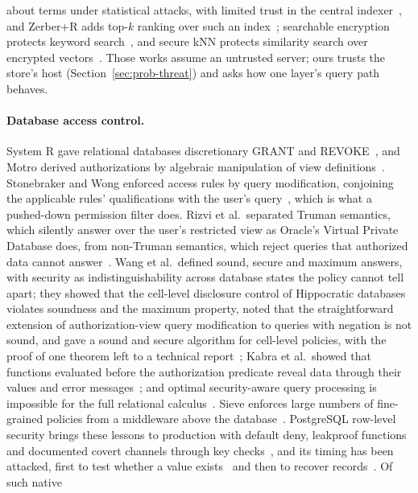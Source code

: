 about terms under statistical attacks, with limited trust in the central indexer~\cite{zerr2008zerber},
and Zerber+R adds top-$k$ ranking over such an index~\cite{zerr2009zerberr}; searchable encryption
protects keyword search~\cite{song2000practical,curtmola2006searchable}, and secure kNN protects
similarity search over encrypted vectors~\cite{wong2009secure}. Those works assume an untrusted
server; ours trusts the store's host (Section~\ref{sec:prob-threat}) and asks how one layer's
query path behaves.

\paragraph{Database access control.}
System R gave relational databases discretionary GRANT and REVOKE~\cite{griffiths1976authorization},
and Motro derived authorizations by algebraic manipulation of view
definitions~\cite{motro1989access}. Stonebraker and Wong enforced access rules by query modification,
conjoining the applicable rules' qualifications with the user's query~\cite{stonebraker1974access},
which is what a pushed-down permission filter does. Rizvi et al.\ separated Truman semantics, which
silently answer over the user's restricted view as Oracle's Virtual Private Database does, from
non-Truman semantics, which reject queries that authorized data cannot
answer~\cite{rizvi2004extending,oracle2026using}. Wang et al.\ defined sound, secure and maximum
answers, with security as indistinguishability across database states the policy cannot tell apart; they showed that the cell-level
disclosure control of Hippocratic databases~\cite{lefevre2004limiting} violates soundness and
the maximum property, noted that the straightforward extension of authorization-view query modification to queries with negation is not sound, and gave a sound and secure algorithm for cell-level policies, with the proof of one theorem left to a technical report~\cite{wang2007correctness}; Kabra et al.\ showed that functions evaluated before the authorization predicate reveal data through their values
and error messages~\cite{kabra2006redundancy}; and optimal security-aware query processing is
impossible for the full relational calculus~\cite{guarnieri2014optimal}. Sieve enforces large numbers
of fine-grained policies from a middleware above the database~\cite{pappachan2020sieve}. PostgreSQL
row-level security brings these lessons to production with default deny, leakproof functions and
documented covert channels through key checks~\cite{postgresql2026row}, and its timing has been attacked, first to test whether a value exists~\cite{dar2023rls,rasin2024vulnerability} and then to recover records~\cite{espiritu2026plaintext}. Of such native
